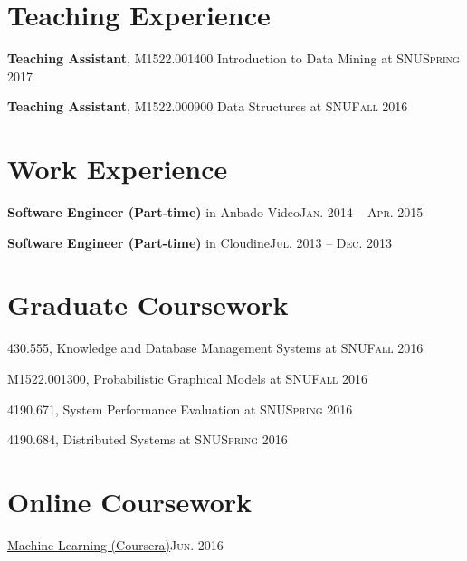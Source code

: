 \documentclass[11pt,a4paper]{article}
\renewenvironment{itemize}{
  \begin{list}{}{
    \setlength{\leftmargin}{1.5em}
    \setlength{\itemsep}{0.5em}
    \setlength{\parskip}{0pt}
    \setlength{\parsep}{0.25em}
  }
}{
  \end{list}
}
\begin{document}
\section*{Teaching Experience}
\begin{itemize}
	\setlength\itemsep{0.1em}
	\item \textbf{Teaching Assistant}, M1522.001400 Introduction to Data Mining at SNU\hfill\textsc{Spring 2017}
	\item \textbf{Teaching Assistant}, M1522.000900 Data Structures at SNU\hfill\textsc{Fall 2016}
\end{itemize}

\section*{Work Experience}
\begin{itemize}
	\setlength\itemsep{0.1em}
  \item \textbf{Software Engineer (Part-time)} in Anbado Video\hfill\textsc{Jan. 2014 -- Apr. 2015}
  \item \textbf{Software Engineer (Part-time)} in Cloudine\hfill\textsc{Jul. 2013 -- Dec. 2013}
\end{itemize}

\section*{Graduate Coursework}
\begin{itemize}
	\setlength\itemsep{0.1em}
	\item 430.555, Knowledge and Database Management Systems at SNU\hfill\textsc{Fall 2016}
	\item M1522.001300, Probabilistic Graphical Models at SNU\hfill\textsc{Fall 2016}
	\item 4190.671, System Performance Evaluation at SNU\hfill\textsc{Spring 2016}
	\item 4190.684, Distributed Systems at SNU\hfill\textsc{Spring 2016}
\end{itemize}

\section*{Online Coursework}
\begin{itemize}
	\setlength\itemsep{0.1em}
	\item \href{https://www.coursera.org/account/accomplishments/certificate/E5NGPPWHVAU8}{Machine Learning (Coursera)}\hfill\textsc{Jun. 2016}
\end{itemize}
\end{document}
